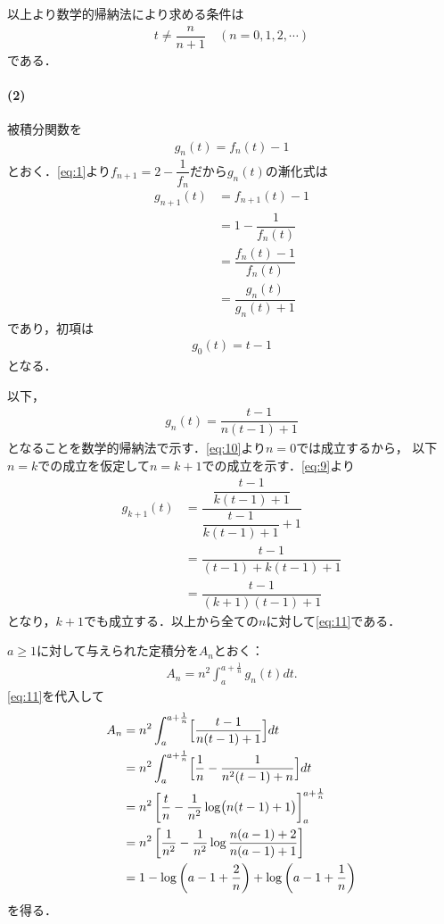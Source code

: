 \documentclass[../../main.tex]{subfiles}
\begin{document}
以上より数学的帰納法により求める条件は
\begin{align}
  t\ne\dfrac{n}{n+1}\quad(n = 0,1,2,\cdots ) \label{eq:7}
\end{align}
である．

\paragraph{(2)}
被積分関数を
\begin{align}
  g_n(t)=f_n(t)-1 \label{eq:8}
\end{align}
とおく．\cref{eq:1}より$f_{n+1}=2-\dfrac{1}{f_n}$だから$g_n(t)$の漸化式は
\begin{align}
  g_{n+1}(t)
  &=f_{n+1}(t)-1 \\
  &=1-\dfrac{1}{f_n(t)} \\
  &=\dfrac{f_n(t)-1}{f_n(t)} \\
  &=\dfrac{g_n(t)}{g_n(t)+1} \label{eq:9}
\end{align}
であり，初項は
\begin{align}
  g_0(t)=t-1 \label{eq:10}
\end{align}
となる．

以下，
\begin{align}
  g_n(t)=\dfrac{t-1}{n(t-1)+1} \label{eq:11}
\end{align}
となることを数学的帰納法で示す．\cref{eq:10}より$n=0$では成立するから，
以下$n=k$での成立を仮定して$n=k+1$での成立を示す．\cref{eq:9}より
\begin{align}
  g_{k+1}(t)
  &=\dfrac{\dfrac{t-1}{k(t-1)+1}}{\dfrac{t-1}{k(t-1)+1}+1} \\
  &=\dfrac{t-1}{(t-1)+k(t-1)+1} \\
  &=\dfrac{t-1}{(k+1)(t-1)+1}
\end{align}
となり，$k+1$でも成立する．以上から全ての$n$に対して\cref{eq:11}である．

$a \ge 1$に対して与えられた定積分を$A_n$とおく：
\begin{align}
  A_n = n^2 \int_{a}^{a+\frac{1}{n}} g_n(t) dt. \label{eq:12}
\end{align}
\cref{eq:11}を代入して
\begin{align}
  A_n
  &= n^2 \int_{a}^{a+\frac{1}{n}} \Bigl[\dfrac{t-1}{n(t-1)+1}\Bigr] dt \\
  &= n^2 \int_{a}^{a+\frac{1}{n}} \Bigl[\dfrac{1}{n}-\dfrac{1}{n^2(t-1)+n} \Bigr] dt \\
  &= n^2 \left[\dfrac{t}{n}-\dfrac{1}{n^2}\log\bigl(n(t-1)+1\bigr)\right]_a^{a+\frac{1}{n}} \\
  &= n^2\left[\dfrac{1}{n^2}-\dfrac{1}{n^2}\log\dfrac{n(a-1)+2}{n(a-1)+1}\right] \\
  &= 1-\log\left(a-1+\dfrac{2}{n}\right)+\log\left(a-1+\dfrac{1}{n}\right) \label{eq:13}
\end{align}
を得る．
\end{document}
